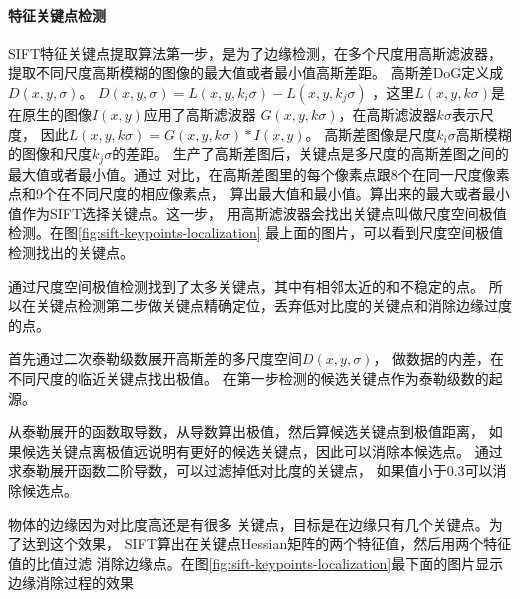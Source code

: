 \paragraph*{特征关键点检测}
SIFT特征关键点提取算法第一步，是为了边缘检测，在多个尺度用高斯滤波器，
提取不同尺度高斯模糊的图像的最大值或者最小值高斯差距。
高斯差DoG定义成$D \left( x, y, \sigma \right)$。
$D \left( x, y, \sigma \right) = L \left( x, y, k_i\sigma \right) - L \left( x, y, k_j\sigma \right)$
，这里$L \left( x, y, k\sigma \right)$是在原生的图像$I \left( x, y \right)$应用了高斯滤波器
$G \left( x, y, k\sigma \right)$，在高斯滤波器$k \sigma$表示尺度，
因此$L \left( x, y, k\sigma \right) = G \left( x, y, k\sigma \right) * I \left( x, y \right)$。
高斯差图像是尺度$k_i\sigma$高斯模糊的图像和尺度$k_j\sigma$的差距。
生产了高斯差图后，关键点是多尺度的高斯差图之间的最大值或者最小值。通过
对比，在高斯差图里的每个像素点跟8个在同一尺度像素点和9个在不同尺度的相应像素点，
算出最大值和最小值。算出来的最大或者最小值作为SIFT选择关键点。这一步，
用高斯滤波器会找出关键点叫做尺度空间极值检测。在图\ref{fig:sift-keypoints-localization}
最上面的图片，可以看到尺度空间极值检测找出的关键点。

通过尺度空间极值检测找到了太多关键点，其中有相邻太近的和不稳定的点。
所以在关键点检测第二步做关键点精确定位，丢弃低对比度的关键点和消除边缘过度的点。

首先通过二次泰勒级数展开高斯差的多尺度空间$D \left( x, y, \sigma \right)$，
做数据的内差，在不同尺度的临近关键点找出极值。
在第一步检测的候选关键点作为泰勒级数的起源。

从泰勒展开的函数取导数，从导数算出极值，然后算候选关键点到极值距离，
如果候选关键点离极值远说明有更好的候选关键点，因此可以消除本候选点。
通过求泰勒展开函数二阶导数，可以过滤掉低对比度的关键点，
如果值小于0.3可以消除候选点。

物体的边缘因为对比度高还是有很多
关键点，目标是在边缘只有几个关键点。为了达到这个效果，
SIFT算出在关键点Hessian矩阵的两个特征值，然后用两个特征值的比值过滤
消除边缘点。在图\ref{fig:sift-keypoints-localization}最下面的图片显示
边缘消除过程的效果

